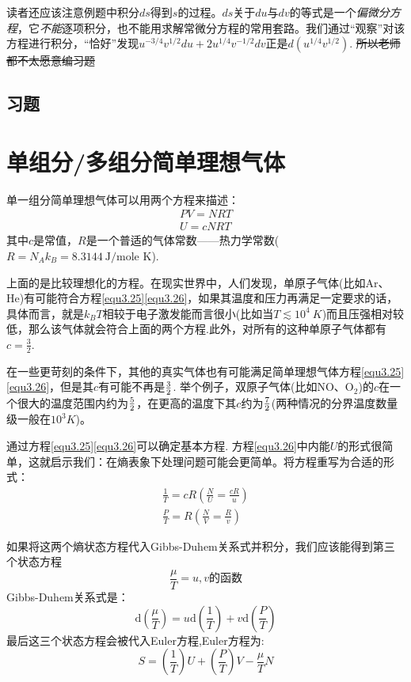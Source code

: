 读者还应该注意例题中积分$ds$得到$s$的过程。$ds$关于$du$与$dv$的等式是一个{\it 偏微分方程}，它{\it 不能}逐项积分，也不能用求解常微分方程的常用套路。我们通过“观察”对该方程进行积分，“恰好”发现$u^{-3/4} v^{1/2} du + 2u^{1/4} v^{-1/2} dv$正是$d(u^{1/4} v^{1/2})$. \sout{所以老师都不太愿意编习题}

\subsection*{习题}


\section{单组分/多组分简单理想气体}
\label{sec3.4}

单一组分简单理想气体可以用两个方程来描述：
\begin{align}
PV=NRT \label{equ3.25}\\
U=cNRT \label{equ3.26}
\end{align}
其中$c$是常值，$R$是一个普适的气体常数——热力学常数($R=N_Ak_B=8.3144\ \text{J/mole K}$).

上面的是比较理想化的方程。在现实世界中，人们发现，单原子气体(比如Ar、He)有可能符合方程\eqref{equ3.25}\eqref{equ3.26}，如果其温度和压力再满足一定要求的话，具体而言，就是$k_BT$相较于电子激发能而言很小(比如当$T\lesssim 10^4\ K$)而且压强相对较低，那么该气体就会符合上面的两个方程.此外，对所有的这种单原子气体都有$c=\frac{3}{2}$.

在一些更苛刻的条件下，其他的真实气体也有可能满足简单理想气体方程\eqref{equ3.25}\eqref{equ3.26}，但是其$c$有可能不再是$3\over2$. 举个例子，双原子气体(比如NO、O$_2$)的$c$在一个很大的温度范围内约为${5\over2}$，在更高的温度下其$c$约为$7\over2$(两种情况的分界温度数量级一般在$10^3K$)。

通过方程\eqref{equ3.25}\eqref{equ3.26}可以确定基本方程. 方程\eqref{equ3.26}中内能$U$的形式很简单，这就启示我们：在熵表象下处理问题可能会更简单。将方程重写为合适的形式：
\begin{align}
\frac{1}{T}=cR(\frac{N}{U}=\frac{cR}{u})\label{equ3.27}\\
\frac{P}{T}=R(\frac{N}{V}=\frac{R}{v})\label{equ3.28}
\end{align}

如果将这两个熵状态方程代入Gibbs-Duhem关系式并积分，我们应该能得到第三个状态方程
\begin{equation}
\label{equ3.29}
\frac{\mu}{T}=u,v\text{的函数}
\end{equation}
Gibbs-Duhem关系式是：
\begin{equation}
\label{equ3.30}
\text{d}(\frac{\mu}{T})=u\text{d}(\frac{1}{T})+v\text{d}(\frac{P}{T})
\end{equation}
最后这三个状态方程会被代入Euler方程,Euler方程为:
\begin{equation}
\label{equ3.31}
S=(\frac{1}{T})U+(\frac{P}{T})V-\frac{\mu}{T}N
\end{equation}

